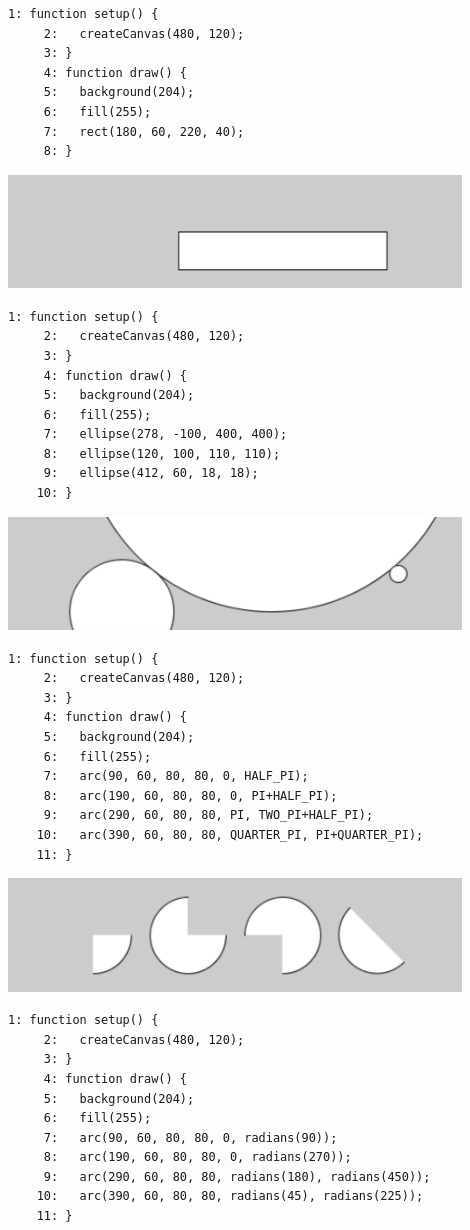 \documentclass[a4j]{ltjsarticle}
\begin{document}
\begin{lstlisting}[caption=Ex\_03\_05.js]
     1: function setup() {
     2:   createCanvas(480, 120);
     3: }
     4: function draw() {
     5:   background(204);
     6:   fill(255); 
     7:   rect(180, 60, 220, 40);
     8: }
\end{lstlisting}
\includegraphics[height=3cm]{image/Ex_03_05.pdf}
\begin{lstlisting}[caption=Ex\_03\_06.js]
     1: function setup() {
     2:   createCanvas(480, 120);
     3: }
     4: function draw() {
     5:   background(204);
     6:   fill(255);
     7:   ellipse(278, -100, 400, 400);
     8:   ellipse(120, 100, 110, 110);
     9:   ellipse(412, 60, 18, 18);
    10: }
\end{lstlisting}
\includegraphics[height=3cm]{image/Ex_03_06.pdf}
\begin{lstlisting}[caption=Ex\_03\_07.js]
     1: function setup() {
     2:   createCanvas(480, 120);
     3: }
     4: function draw() {
     5:   background(204);
     6:   fill(255);
     7:   arc(90, 60, 80, 80, 0, HALF_PI);
     8:   arc(190, 60, 80, 80, 0, PI+HALF_PI);
     9:   arc(290, 60, 80, 80, PI, TWO_PI+HALF_PI);
    10:   arc(390, 60, 80, 80, QUARTER_PI, PI+QUARTER_PI);
    11: }
\end{lstlisting}
\includegraphics[height=3cm]{image/Ex_03_07.pdf}
\begin{lstlisting}[caption=Ex\_03\_08.js]
     1: function setup() {
     2:   createCanvas(480, 120);
     3: }
     4: function draw() {
     5:   background(204);
     6:   fill(255);
     7:   arc(90, 60, 80, 80, 0, radians(90));
     8:   arc(190, 60, 80, 80, 0, radians(270));
     9:   arc(290, 60, 80, 80, radians(180), radians(450));
    10:   arc(390, 60, 80, 80, radians(45), radians(225));
    11: }
\end{lstlisting}
\end{document}
